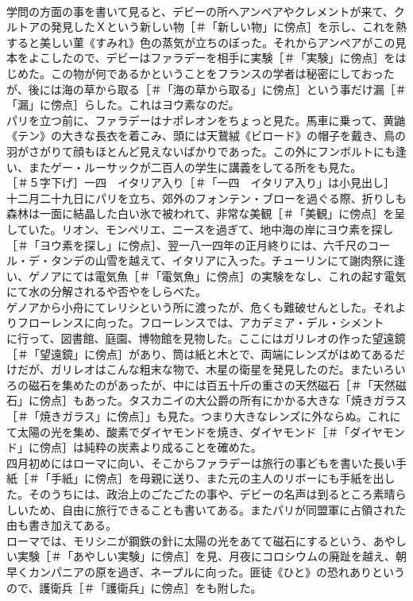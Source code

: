 \documentclass[8pt]{extreport}
\begin{document}
\begin{CJK}{UTF8}{min}
\\	学問の方面の事を書いて見ると、デビーの所へアンペアやクレメントが来て、クルトアの発見したＸという新しい物［＃「新しい物」に傍点］を示し、これを熱すると美しい菫《すみれ》色の蒸気が立ちのぼった。それからアンペアがこの見本をよこしたので、デビーはファラデーを相手に実験［＃「実験」に傍点］をはじめた。この物が何であるかということをフランスの学者は秘密にしておったが、後には海の草から取る［＃「海の草から取る」に傍点］という事だけ漏［＃「漏」に傍点］らした。これはヨウ素なのだ。
\\	パリを立つ前に、ファラデーはナポレオンをちょっと見た。馬車に乗って、黄鼬《テン》の大きな長衣を着こみ、頭には天鵞絨《ビロード》の帽子を戴き、鳥の羽がさがりて顔もほとんど見えないばかりであった。この外にフンボルトにも逢い、またゲー・ルーサックが二百人の学生に講義をしてる所をも見た。
\\	［＃５字下げ］一四　イタリア入り［＃「一四　イタリア入り」は小見出し］
\\	十二月二十九日にパリを立ち、郊外のフォンテン・ブローを過ぐる際、折りしも森林は一面に結晶した白い氷で被われて、非常な美観［＃「美観」に傍点］を呈していた。リオン、モンペリエ、ニースを過ぎて、地中海の岸にヨウ素を探し［＃「ヨウ素を探し」に傍点］、翌一八一四年の正月終りには、六千尺のコール・デ・タンデの山雪を越えて、イタリアに入った。チューリンにて謝肉祭に逢い、ゲノアにては電気魚［＃「電気魚」に傍点］の実験をなし、これの起す電気にて水の分解されるや否やをしらべた。
\\	ゲノアから小舟にてレリシという所に渡ったが、危くも難破せんとした。それよりフローレンスに向った。フローレンスでは、アカデミア・デル・シメント
\\	に行って、図書館、庭園、博物館を見物した。ここにはガリレオの作った望遠鏡［＃「望遠鏡」に傍点］があり、筒は紙と木とで、両端にレンズがはめてあるだけだが、ガリレオはこんな粗末な物で、木星の衛星を発見したのだ。またいろいろの磁石を集めたのがあったが、中には百五十斤の重さの天然磁石［＃「天然磁石」に傍点］もあった。タスカニイの大公爵の所有にかかる大きな「焼きガラス［＃「焼きガラス」に傍点］」も見た。つまり大きなレンズに外ならぬ。これにて太陽の光を集め、酸素でダイヤモンドを焼き、ダイヤモンド［＃「ダイヤモンド」に傍点］は純粋の炭素より成ることを確めた。
\\	四月初めにはローマに向い、そこからファラデーは旅行の事どもを書いた長い手紙［＃「手紙」に傍点］を母親に送り、また元の主人のリボーにも手紙を出した。そのうちには、政治上のごたごたの事や、デビーの名声は到るところ素晴らしいため、自由に旅行できることも書いてある。またパリが同盟軍に占領された由も書き加えてある。
\\	ローマでは、モリシニが鋼鉄の針に太陽の光をあてて磁石にするという、あやしい実験［＃「あやしい実験」に傍点］を見、月夜にコロシウムの廃趾を越え、朝早くカンパニアの原を過ぎ、ネープルに向った。匪徒《ひと》の恐れありというので、護衛兵［＃「護衛兵」に傍点］をも附した。

\end{CJK}
\end{document}

